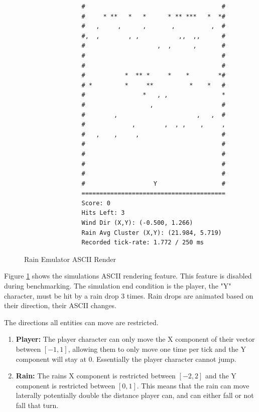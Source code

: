 \begin{figure}[htbp]
    \centering
    \begin{verbatim}
                #                                      #
                #     * **   *   *      * ** ***   *  *#
                #   ,     ,      ,       ,          ,  #
                #,  ,        , ,           ,,  ,,      #
                #                    ,  ,      ,       #
                #                                      #
                #                                      #
                #           *  ** *     *    *        *#
                # *         *     **          *    *   #
                #                *   , ,               *
                #                  ,                   #
                #        ,                      ,   ,  #
                #             ,        ,  , ,    ,     ,
                #   ,    ,     ,                       #
                #                                      #
                #                                      #
                #                                      #
                #                                      #
                #                   Y                  #
                ========================================
                Score: 0
                Hits Left: 3
                Wind Dir (X,Y): (-0.500, 1.266)
                Rain Avg Cluster (X,Y): (21.984, 5.719)
                Recorded tick-rate: 1.772 / 250 ms
    \end{verbatim}
    \caption{Rain Emulator ASCII Render}
    \label{sim:rain}
\end{figure}

Figure \ref{sim:rain} shows the simulations ASCII rendering feature. This feature is disabled during benchmarking. The simulation end condition is the player, the "Y" character, must be hit by a rain drop 3 times. Rain drops are animated based on their direction, their ASCII changes. 

The directions all entities can move are restricted. 
\begin{enumerate}
    \item \textbf{Player:} The player character can only move the X component of their vector between $[-1, 1]$, allowing them to only move one time per tick and the Y component will stay at 0. Essentially the player character cannot jump. 
    \item \textbf{Rain:} The rains X component is restricted between $[-2, 2]$ and the Y component is restricted between $[0,1]$. This means that the rain can move laterally potentially double the distance player can, and can either fall or not fall that turn.
\end{enumerate}

